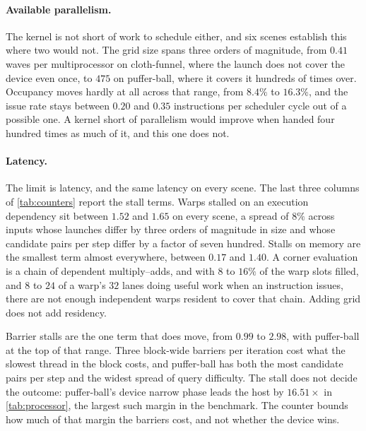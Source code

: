 \paragraph{Available parallelism.} The kernel is not short of work to schedule
either, and six scenes establish this where two would not. The grid size spans
three orders of magnitude, from $0.41$ waves per multiprocessor on cloth-funnel,
where the launch does not cover the device even once, to $475$ on puffer-ball,
where it covers it hundreds of times over. Occupancy moves hardly at all across
that range, from $8.4\%$ to $16.3\%$, and the issue rate stays between $0.20$
and $0.35$ instructions per scheduler cycle out of a possible one. A kernel
short of parallelism would improve when handed four hundred times as much of it,
and this one does not.

\paragraph{Latency.} The limit is latency, and the same latency on every scene.
The last three columns of \cref{tab:counters} report the stall terms. Warps
stalled on an execution dependency sit between $1.52$ and $1.65$ on every scene,
a spread of $8\%$ across inputs whose launches differ by three orders of
magnitude in size and whose candidate pairs per step differ by a factor of seven
hundred. Stalls on memory are the smallest term almost everywhere, between
$0.17$ and $1.40$. A corner evaluation is a chain of dependent multiply--adds,
and with $8$ to $16\%$ of the warp slots filled, and $8$ to $24$ of a warp's
$32$ lanes doing useful work when an instruction issues, there are not enough
independent warps resident to cover that chain. Adding grid does not add
residency.

Barrier stalls are the one term that does move, from $0.99$ to $2.98$, with
puffer-ball at the top of that range. Three block-wide barriers per iteration
cost what the slowest thread in the block costs, and puffer-ball has both the
most candidate pairs per step and the widest spread of query difficulty. The
stall does not decide the outcome: puffer-ball's device narrow phase leads the
host by $16.51\times$ in \cref{tab:processor}, the largest such margin in the
benchmark. The counter bounds how much of that margin the barriers cost, and not
whether the device wins.

